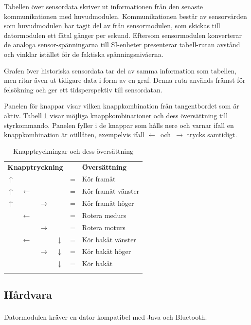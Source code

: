 \documentclass[11pt]{article}
\begin{document}
\begin{flushleft}
Tabellen över sensordata skriver ut informationen från den senaste kommunikationen med huvudmodulen. Kommunikationen består av sensorvärden som huvudmodulen har tagit del av från sensormodulen, som skickas till datormodulen ett fåtal gånger per sekund. Eftersom sensormodulen konverterar de analoga sensor-spänningarna till SI-enheter presenterar tabell-rutan avstånd och vinklar istället för de faktiska spänningsnivåerna. 

Grafen över historiska sensordata tar del av samma information som tabellen, men ritar även ut tidigare data i form av en graf. Denna ruta används främst för felsökning och ger ett tidsperspektiv till sensordatan.

Panelen för knappar visar vilken knappkombination från tangentbordet som är aktiv. Tabell \ref{datormodul:combinations} visar möjliga knappkombinationer och dess översättning till styrkommando. Panelen fyller i de knappar som hålls nere och varnar ifall en knappkombination är otillåten, exempelvis ifall \mbox{$\leftarrow$ och $\rightarrow$} trycks samtidigt.

\begin{longtable}{|p{.05\linewidth} p{.05\linewidth} p{.05\linewidth} p{.05\linewidth} c l|}
	\multicolumn{4}{c}{\textbf{Knapptryckning}} & & \multicolumn{1}{l}{\textbf{Översättning}} 	\\ \nobreakhline\nobreakhline 
	$\uparrow$ &  				&  				& 				& = & Kör framåt 				\\ \nobreakhline 
	$\uparrow$ & $\leftarrow$	&				&				& = & Kör framåt vänster 		\\ \nobreakhline 
	$\uparrow$ &				& $\rightarrow$	&				& = & Kör framåt höger 			\\ \nobreakhline 
			   & $\leftarrow$	&				&				& = & Rotera medurs 			\\ \nobreakhline
			   &				& $\rightarrow$	&				& = & Rotera moturs 			\\ \nobreakhline
			   & $\leftarrow$	&				& $\downarrow$	& = & Kör bakåt vänster 		\\ \nobreakhline
			   &				& $\rightarrow$ & $\downarrow$	& = & Kör bakåt höger 			\\ \nobreakhline
			   &				&				& $\downarrow$	& = & Kör bakåt 				\\ \nobreakhline
	\caption{Knapptryckningar och dess översättning} \label{datormodul:combinations}
\end{longtable}



\subsection{Hårdvara}
Datormodulen kräver en dator kompatibel med Java och Bluetooth\textsuperscript{\circledR}. 


\end{flushleft}
\end{document}
